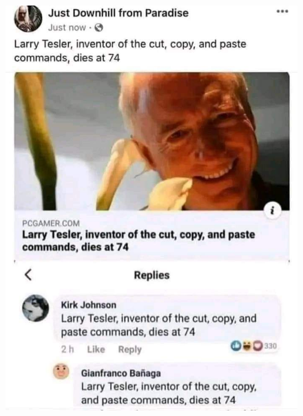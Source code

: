 \documentclass[10pt,t]{beamer}
\begin{document}
\begin{frame}
\begin{figure}
    \includegraphics[scale=0.17]
    {./Presentations-pictures/The-best-salute.jpg}

  \end{figure}




\end{frame}
\end{document}
